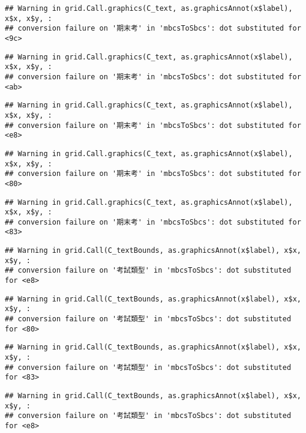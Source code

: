 \documentclass[
]{book}
\begin{document}
\begin{verbatim}
## Warning in grid.Call.graphics(C_text, as.graphicsAnnot(x$label), x$x, x$y, :
## conversion failure on '期末考' in 'mbcsToSbcs': dot substituted for <9c>
\end{verbatim}

\begin{verbatim}
## Warning in grid.Call.graphics(C_text, as.graphicsAnnot(x$label), x$x, x$y, :
## conversion failure on '期末考' in 'mbcsToSbcs': dot substituted for <ab>
\end{verbatim}

\begin{verbatim}
## Warning in grid.Call.graphics(C_text, as.graphicsAnnot(x$label), x$x, x$y, :
## conversion failure on '期末考' in 'mbcsToSbcs': dot substituted for <e8>
\end{verbatim}

\begin{verbatim}
## Warning in grid.Call.graphics(C_text, as.graphicsAnnot(x$label), x$x, x$y, :
## conversion failure on '期末考' in 'mbcsToSbcs': dot substituted for <80>
\end{verbatim}

\begin{verbatim}
## Warning in grid.Call.graphics(C_text, as.graphicsAnnot(x$label), x$x, x$y, :
## conversion failure on '期末考' in 'mbcsToSbcs': dot substituted for <83>
\end{verbatim}

\begin{verbatim}
## Warning in grid.Call(C_textBounds, as.graphicsAnnot(x$label), x$x, x$y, :
## conversion failure on '考試類型' in 'mbcsToSbcs': dot substituted for <e8>
\end{verbatim}

\begin{verbatim}
## Warning in grid.Call(C_textBounds, as.graphicsAnnot(x$label), x$x, x$y, :
## conversion failure on '考試類型' in 'mbcsToSbcs': dot substituted for <80>
\end{verbatim}

\begin{verbatim}
## Warning in grid.Call(C_textBounds, as.graphicsAnnot(x$label), x$x, x$y, :
## conversion failure on '考試類型' in 'mbcsToSbcs': dot substituted for <83>
\end{verbatim}

\begin{verbatim}
## Warning in grid.Call(C_textBounds, as.graphicsAnnot(x$label), x$x, x$y, :
## conversion failure on '考試類型' in 'mbcsToSbcs': dot substituted for <e8>
\end{verbatim}
\end{document}

